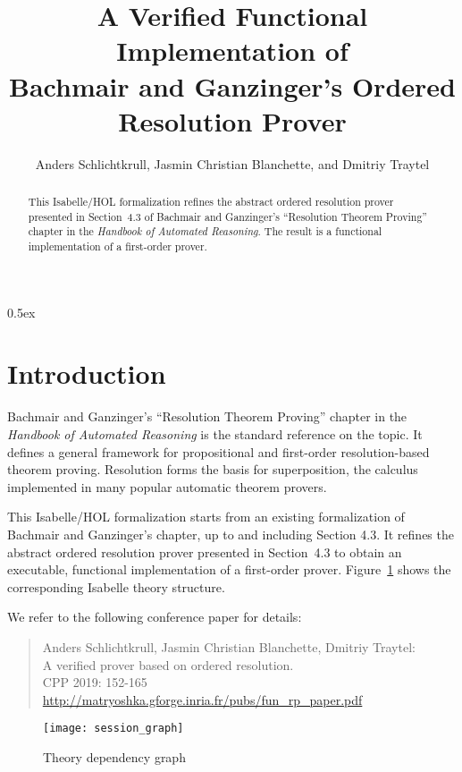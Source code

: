 \documentclass[10pt,a4paper]{article}
\begin{document}
\title{A Verified Functional Implementation of \\ Bachmair and Ganzinger's Ordered Resolution Prover}
\author{Anders Schlichtkrull, Jasmin Christian Blanchette, and Dmitriy Traytel}

\maketitle

\begin{abstract}
\noindent
This Isabelle/HOL formalization refines the abstract ordered resolution prover
presented in Section~4.3 of Bachmair and Ganzinger's ``Resolution Theorem
Proving'' chapter in the \emph{Handbook of Automated Reasoning}. The result
is a functional implementation of a first-order prover.
\end{abstract}

\tableofcontents

\parindent 0pt
\parskip 0.5ex

\section{Introduction}

Bachmair and Ganzinger's ``Resolution Theorem Proving'' chapter
in the \emph{Handbook of Automated Reasoning} is the standard reference on the
topic. It defines a general framework for propositional and first-order
resolution-based theorem proving. Resolution forms the basis for
superposition, the calculus implemented in many popular automatic theorem
provers.

\medskip

This Isabelle/HOL formalization starts from an existing formalization of
Bachmair and Ganzinger's chapter, up to and including Section 4.3. It refines
the abstract ordered resolution prover presented in Section~4.3 to obtain an
executable, functional implementation of a first-order prover.
Figure~\ref{fig:thys} shows the corresponding Isabelle theory structure.

\medskip

We refer to the following conference paper for details:

\begin{quote}
Anders Schlichtkrull, Jasmin Christian Blanchette, Dmitriy Traytel: \\
A verified prover based on ordered resolution. \\
CPP 2019: 152-165 \\
\url{http://matryoshka.gforge.inria.fr/pubs/fun_rp_paper.pdf}
\end{quote}

\begin{figure}
\begin{center}
  \texttt{[image: session\_graph]}
\end{center}
\caption{Theory dependency graph}
\label{fig:thys}
\end{figure}



% 
% 
\end{document}
